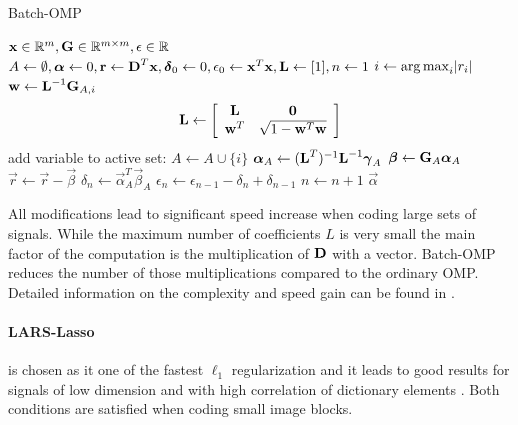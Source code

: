 \begin{algorithm}[h]
\caption{Batch-OMP}
\label{alg:batchOMP}
\begin{algorithmic}[1]
\REQUIRE $\boldsymbol{\mathrm{x}} \in \mathbb{R}^{m}, \boldsymbol{\mathrm{G}}  \in
\mathbb{R}^{m\times m}, \epsilon \in \mathbb{R}$
\STATE $A \gets \emptyset,\boldsymbol{\mathrm{\alpha}} \gets 0,\boldsymbol{\mathrm{r}} \gets
\boldsymbol{\mathrm{D}}^T\boldsymbol{\mathrm{x}},\boldsymbol{\mathrm{\delta}}_0 \gets
0, \epsilon_0\gets \boldsymbol{\mathrm{x}}^T\boldsymbol{\mathrm{x}},\boldsymbol{\mathrm{L}}\gets[1],n\gets1$
\STATE $i \gets \operatorname*{arg\,max}_i\lvert r_i \rvert$
\STATE $\boldsymbol{\mathrm{w}} \gets \boldsymbol{\mathrm{L}}^{-1}\boldsymbol{\mathrm{G}}_{A,i}$
\STATE
\begin{align}
\boldsymbol{\mathrm{L}} \gets \left[
\begin{array}{ccc}
\boldsymbol{\mathrm{L}} & \boldsymbol{\mathrm{0}}\\
\boldsymbol{\mathrm{w}}^T & \sqrt{1-\boldsymbol{\mathrm{w}}^T\boldsymbol{\mathrm{w}}}
\end{array}
\right]
\end{align}
\ENDIF
\STATE add variable to active set: $A \gets A \cup \{ i\}$
\STATE $\boldsymbol{\mathrm{\alpha}}_A \gets (\boldsymbol{\mathrm{L}}^T)^{-1}\boldsymbol{\mathrm{L}}^{-1}\boldsymbol{\mathrm{\gamma}}_A$
\STATE $\boldsymbol{\mathrm{\beta}} \gets \boldsymbol{\mathrm{G}}_A\boldsymbol{\mathrm{\alpha}}_A$
\STATE $\vec{r} \gets \vec{r}-\vec{\beta}$
\STATE $\delta_{n} \gets \vec{\alpha}_A^T\vec{\beta}_A$
\STATE $\epsilon_n \gets \epsilon_{n-1} - \delta_n + \delta_{n-1}$
\STATE $n \gets n+1$
\ENDWHILE
\RETURN $\vec{\alpha}$
\end{algorithmic}
\end{algorithm}

All modifications lead to significant speed increase when coding large sets of
signals. While the maximum number of coefficients $L$ is very small the main
factor of the computation is the multiplication of $\boldsymbol{\mathrm{D}}$ with a vector.
Batch-OMP reduces the number of those multiplications compared to the ordinary
OMP. Detailed information on the complexity and speed gain can be found in
\cite{Rubinstein2008}. 


\paragraph{LARS-Lasso} is chosen as it one of the fastest $\ell_1$
regularization and it leads to good results for signals of low dimension and
with high correlation of dictionary elements \cite{Mairal2010}. Both conditions
are satisfied when coding small image blocks.

